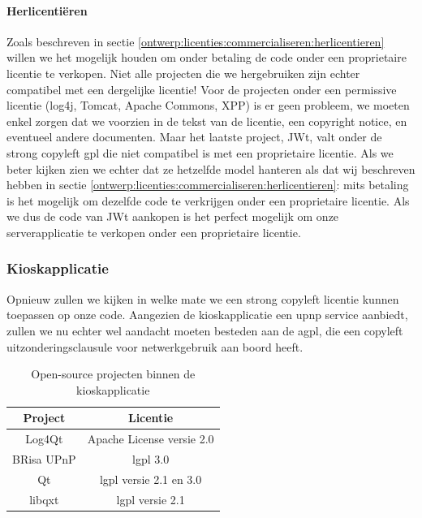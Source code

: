 \paragraph{Herlicentiëren} Zoals beschreven in sectie \ref{ontwerp:licenties:commercialiseren:herlicentieren} willen we het mogelijk houden om onder betaling de code onder een proprietaire licentie te verkopen. Niet alle projecten die we hergebruiken zijn echter compatibel met een dergelijke licentie! Voor de projecten onder een permissive licentie (log4j, Tomcat, Apache Commons, XPP) is er geen probleem, we moeten enkel zorgen dat we voorzien in de tekst van de licentie, een copyright notice, en eventueel andere documenten. Maar het laatste project, JWt, valt onder de strong copyleft \ac{gpl} die niet compatibel is met een proprietaire licentie. Als we beter kijken zien we echter dat ze hetzelfde model hanteren als dat wij beschreven hebben in sectie \ref{ontwerp:licenties:commercialiseren:herlicentieren}: mits betaling is het mogelijk om dezelfde code te verkrijgen onder een proprietaire licentie. Als we dus de code van JWt aankopen is het perfect mogelijk om onze serverapplicatie te verkopen onder een proprietaire licentie.

\subsubsection{Kioskapplicatie}
\label{ontwerp:licenties:keuze:software:kiosk}

Opnieuw zullen we kijken in welke mate we een strong copyleft licentie kunnen toepassen op onze code. Aangezien de kioskapplicatie een \ac{upnp} service aanbiedt, zullen we nu echter wel aandacht moeten besteden aan de \ac{agpl}, die een copyleft uitzonderingsclausule voor netwerkgebruik aan boord heeft.

\begin{table}
  \begin{center}
    \begin{tabular}{c c}
    Project & Licentie \\
    \hline
    Log4Qt & Apache License versie 2.0 \\
    BRisa UPnP & \ac{lgpl} 3.0 \\
    Qt & \ac{lgpl} versie 2.1 en 3.0 \\
    libqxt & \ac{lgpl} versie 2.1 \\
    \end{tabular}
  \end{center}
  \caption{Open-source projecten binnen de kioskapplicatie}
  \label{tbl:licenties:kiosk:projecten}
\end{table}

